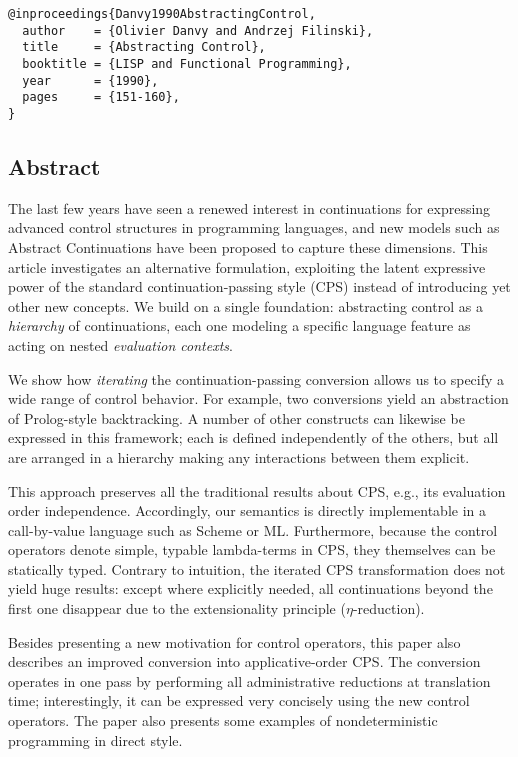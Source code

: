 \documentclass[letterpaper]{llncs}
\begin{document}
\begin{verbatim}
@inproceedings{Danvy1990AbstractingControl,
  author    = {Olivier Danvy and Andrzej Filinski},
  title     = {Abstracting Control},
  booktitle = {LISP and Functional Programming},
  year      = {1990},
  pages     = {151-160},
}
\end{verbatim}


\subsection*{Abstract}
The last few years have seen a renewed interest in continuations for expressing advanced control structures in programming languages, and new models such as Abstract Continuations have been proposed to capture these dimensions. This article investigates an alternative formulation, exploiting the latent expressive power of the standard continuation-passing style (CPS) instead of introducing yet other new concepts. We build on a single foundation: abstracting control as a \textit{hierarchy} of continuations, each one modeling a specific language feature as acting on nested \textit{evaluation contexts}. 

We show how \textit{iterating} the continuation-passing conversion allows us to specify a wide range of control behavior. For example, two conversions yield an abstraction of Prolog-style backtracking. A number of other constructs can likewise be expressed in this framework; each is defined independently of the others, but all are arranged in a hierarchy making any interactions between them explicit. 

This approach preserves all the traditional results about CPS, e.g., its evaluation order independence. Accordingly, our semantics is directly implementable in a call-by-value language such as Scheme or ML. Furthermore, because the control operators denote simple, typable lambda-terms in CPS, they themselves can be statically typed. Contrary to intuition, the iterated CPS transformation does not yield huge results: except where explicitly needed, all continuations beyond the first one disappear due to the extensionality principle ($\eta$-reduction). 

Besides presenting a new motivation for control operators, this paper also describes an improved conversion into applicative-order CPS. The conversion operates in one pass by performing all administrative reductions at translation time; interestingly, it can be expressed very concisely using the new control operators. The paper also presents some examples of nondeterministic programming in direct style.  









\end{document}
